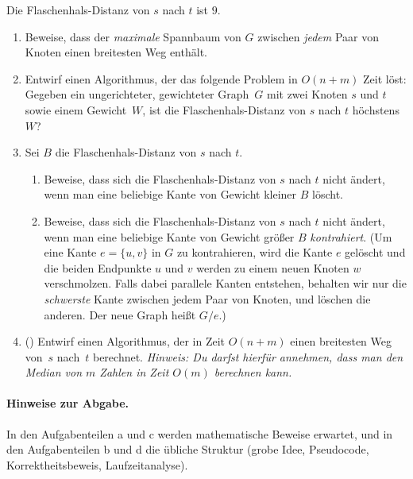 \documentclass{uebung_cs}
\begin{document}
\begin{aufgabe}
\begin{center}
        \small Die Flaschenhals-Distanz von $s$ nach $t$ ist $9$.
  \end{center}
  \begin{enumerate}
      \item Beweise, dass der \emph{maximale} Spannbaum von $G$ zwischen \emph{jedem} Paar von Knoten einen breitesten Weg enthält.
      \item Entwirf einen Algorithmus, der das folgende Problem in $O(n+m)$ Zeit löst:
      Gegeben ein ungerichteter, gewichteter Graph~$G$ mit zwei Knoten $s$ und $t$ sowie einem Gewicht~$W$, ist die Flaschenhals-Distanz von $s$ nach $t$ höchstens $W$?
      \item Sei $B$ die Flaschenhals-Distanz von $s$ nach $t$.
        \begin{enumerate}[label=\roman*.]
            \item Beweise, dass sich die Flaschenhals-Distanz von $s$ nach $t$ nicht ändert, wenn man eine beliebige Kante von Gewicht kleiner $B$ löscht.
            \item Beweise, dass sich die Flaschenhals-Distanz von $s$ nach $t$ nicht ändert, wenn man eine beliebige Kante von Gewicht größer $B$ \emph{kontrahiert}.
            (Um eine Kante $e=\{u,v\}$ in $G$ zu kontrahieren, wird die Kante $e$ gelöscht und die beiden Endpunkte $u$ und $v$ werden zu einem neuen Knoten $w$ verschmolzen. Falls dabei parallele Kanten entstehen, behalten wir nur die 
            \emph{schwerste} Kante zwischen jedem Paar von Knoten, und löschen die anderen. Der neue Graph heißt $G/e$.)
        \end{enumerate}
    \item(\veryhard)
    Entwirf einen Algorithmus, der in Zeit $O(n+m)$ einen breitesten Weg von~$s$ nach~$t$ berechnet.
    \emph{Hinweis: Du darfst hierfür annehmen, dass man den Median von $m$ Zahlen in Zeit $O(m)$ berechnen kann.}
  \end{enumerate}
  
  \paragraph*{Hinweise zur Abgabe.}
  In den Aufgabenteilen a und c werden mathematische Beweise erwartet, und in den Aufgabenteilen b und d die übliche Struktur (grobe Idee, Pseudocode, Korrektheitsbeweis, Laufzeitanalyse).

\end{aufgabe}
\end{document}
